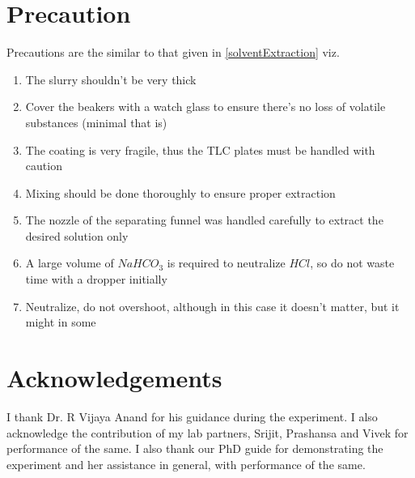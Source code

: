 \section{Precaution}
	Precautions are the similar to that given in \autoref{solventExtraction} viz.
	\begin{enumerate}
		\item The slurry shouldn't be very thick
		\item Cover the beakers with a watch glass to ensure there's no loss of volatile substances (minimal that is)
		\item The coating is very fragile, thus the TLC plates must be handled with caution
		\item Mixing should be done thoroughly to ensure proper extraction
		\item The nozzle of the separating funnel was handled carefully to extract the desired solution only
		\item A large volume of $NaHCO_3$ is required to neutralize $HCl$, so do not waste time with a dropper initially
		\item Neutralize, do not overshoot, although in this case it doesn't matter, but it might in some
	\end{enumerate}

	
\section{Acknowledgements}
I thank Dr. R Vijaya Anand for his guidance during the experiment. I also acknowledge the contribution of my lab partners, Srijit, Prashansa and Vivek for performance of the same. I also thank our PhD guide for demonstrating the experiment and her assistance in general, with performance of the same.


